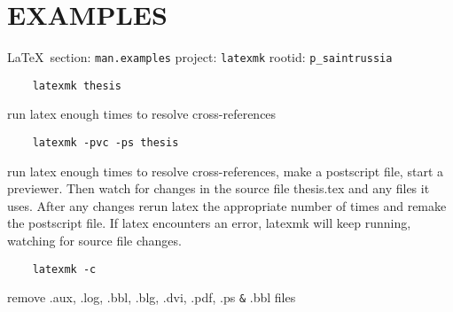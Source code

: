  
 

\clearpage
\section{EXAMPLES}
  
\vspace{0.5cm}
 {\ifDEBUG\small\LaTeX~section: \verb|man.examples| project: \verb|latexmk| rootid: \verb|p_saintrussia| \fi}
\vspace{0.5cm}

\begin{verbatim}
	latexmk thesis    
\end{verbatim}

run latex enough times to resolve cross-references

\begin{verbatim}
	latexmk -pvc -ps thesis
\end{verbatim}

run latex enough times to resolve
cross-references, make a postscript
file, start a previewer.  Then
watch for changes in the source
file thesis.tex and any files it
uses.  After any changes rerun latex
the appropriate number of times and
remake the postscript file.  If latex
encounters an error, latexmk will
keep running, watching for
source file changes.

\begin{verbatim}
	latexmk -c    
\end{verbatim}

remove .aux, .log, .bbl, .blg, .dvi, .pdf, .ps \verb|&| .bbl files


  
